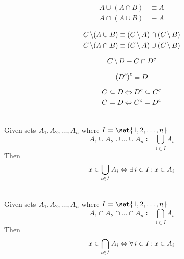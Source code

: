 \begin{definition}
\begin{align}
    A \cup (A \cap B) &\equiv A \\
    A \cap (A \cup B) &\equiv A
\end{align}
\end{definition}

\begin{definition}
\begin{align}
    C \operatorname{\backslash} (A \cup B) &\equiv (C \operatorname{\backslash} A) \cap (C \operatorname{\backslash} B) \\
    C \operatorname{\backslash} (A \cap B) &\equiv (C \operatorname{\backslash} A) \cup (C \operatorname{\backslash} B)
\end{align}
\end{definition}

\begin{definition}
\begin{equation}
    C \operatorname{\backslash} D \equiv C \cap {D}^{c}
\end{equation}
\end{definition}

\begin{definition}
\begin{equation}
    {({D}^{c})}^{c} \equiv D
\end{equation}
\end{definition}

\begin{definition}[Contraposition]
\begin{align}
    C \subseteq D &\Leftrightarrow {D}^{c} \subseteq {C}^{c} \\
    C = D &\Leftrightarrow {C}^{c} = {D}^{c}
\end{align}
\end{definition}

\begin{definition}\ \\
    Given sets $A_1, A_2, \dots, A_n$ where $I = \set{1, 2, \dots, n}$
    \begin{equation}
        A_1 \cup A_2 \cup \dots \cup A_n \coloneqq \bigcup_{i \in I} A_i
    \end{equation}
    Then
    \begin{equation}
        x \in \bigcup_{i \in I} A_i \Leftrightarrow \operatorname{\exists} i \in I \colon x \in A_i
    \end{equation}
\end{definition}

\begin{definition}\ \\
    Given sets $A_1, A_2, \dots, A_n$ where $I = \set{1, 2, \dots, n}$
    \begin{equation}
        A_1 \cap A_2 \cap \dots \cap A_n \coloneqq \bigcap_{i \in I} A_i
    \end{equation}
    Then
    \begin{equation}
        x \in \bigcap_{i \in I} A_i \Leftrightarrow \operatorname{\forall} i \in I \colon x \in A_i
    \end{equation}
\end{definition}

